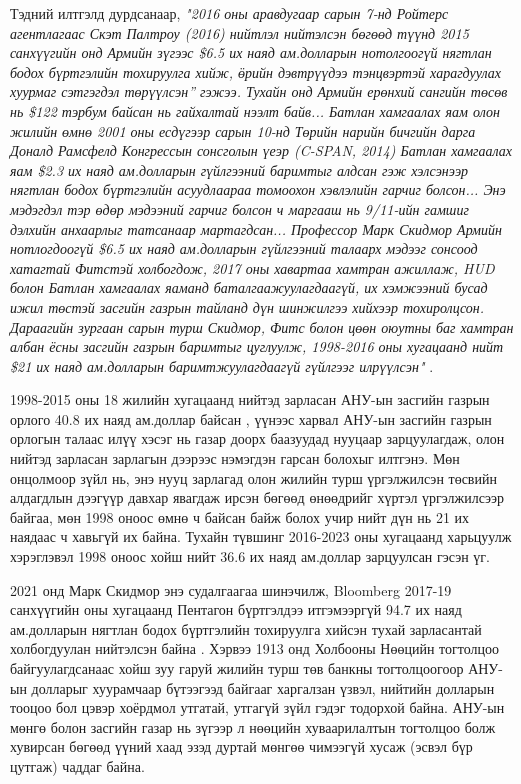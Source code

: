 \documentclass[10pt,twocolumn,letterpaper]{article}
\begin{document}
{Тэдний илтгэлд дурдсанаар, \textit{"2016 оны аравдугаар сарын 7-нд Ройтерс агентлагаас Скэт Палтроу (2016) нийтлэл нийтэлсэн бөгөөд түүнд 2015 санхүүгийн онд Армийн зүгээс \$6.5 их наяд ам.долларын нотолгоогүй нягтлан бодох бүртгэлийн тохируулга хийж, \"өрийн дэвтрүүдээ тэнцвэртэй харагдуулах хуурмаг сэтгэгдэл төрүүлсэн” гэжээ. Тухайн онд Армийн ерөнхий сангийн төсөв нь \$122 тэрбум байсан нь гайхалтай нээлт байв... Батлан хамгаалах яам олон жилийн өмнө 2001 оны есдүгээр сарын 10-нд Төрийн нарийн бичгийн дарга Доналд Рамсфелд Конгрессын сонсголын үеэр (C-SPAN, 2014) Батлан хамгаалах яам \$2.3 их наяд ам.долларын гүйлгээний баримтыг алдсан гэж хэлсэнээр нягтлан бодох бүртгэлийн асуудлаараа томоохон хэвлэлийн гарчиг болсон... Энэ мэдэгдэл тэр өдөр мэдээний гарчиг болсон ч маргааш нь 9/11-ийн гамшиг дэлхийн анхаарлыг татсанаар мартагдсан... Профессор Марк Скидмор Армийн нотлогдоогүй \$6.5 их наяд ам.долларын гүйлгээний талаарх мэдээг сонсоод хатагтай Фитстэй холбогдож, 2017 оны хавартаа хамтран ажиллаж, HUD болон Батлан хамгаалах яаманд баталгаажуулагдаагүй, их хэмжээний бусад ижил төстэй засгийн газрын тайланд дүн шинжилгээ хийхээр тохиролцсон. Дараагийн зургаан сарын турш Скидмор, Фитс болон цөөн оюутны баг хамтран албан ёсны засгийн газрын баримтыг цуглуулж, 1998-2016 оны хугацаанд нийт \$21 их наяд ам.долларын баримтжуулагдаагүй гүйлгээг илрүүлсэн"} \cite{12}.

1998-2015 оны 18 жилийн хугацаанд нийтэд зарласан АНУ-ын засгийн газрын орлого 40.8 их наяд ам.доллар байсан \cite{15}, үүнээс харвал АНУ-ын засгийн газрын орлогын талаас илүү хэсэг нь газар доорх баазуудад нууцаар зарцуулагдаж, олон нийтэд зарласан зарлагын дээрээс нэмэгдэн гарсан болохыг илтгэнэ. Мөн онцолмоор зүйл нь, энэ нууц зарлагад олон жилийн турш үргэлжилсэн төсвийн алдагдлын дээгүүр давхар явагдаж ирсэн бөгөөд өнөөдрийг хүртэл үргэлжилсээр байгаа, мөн 1998 оноос өмнө ч байсан байж болох учир нийт дүн нь 21 их наядаас ч хавьгүй их байна. Тухайн түвшинг 2016-2023 оны хугацаанд харьцуулж хэрэглэвэл 1998 оноос хойш нийт 36.6 их наяд ам.доллар зарцуулсан гэсэн үг.

2021 онд Марк Скидмор энэ судалгаагаа шинэчилж, Bloomberg 2017-19 санхүүгийн оны хугацаанд Пентагон бүртгэлдээ итгэмээргүй 94.7 их наяд ам.долларын нягтлан бодох бүртгэлийн тохируулга хийсэн тухай зарласантай холбогдуулан нийтэлсэн байна \cite{17,18}. Хэрвээ 1913 онд Холбооны Нөөцийн тогтолцоо байгуулагдсанаас хойш зуу гаруй жилийн турш төв банкны тогтолцоогоор АНУ-ын долларыг хуурамчаар бүтээгээд байгааг харгалзан үзвэл, нийтийн долларын тооцоо бол цэвэр хоёрдмол утгатай, утгагүй зүйл гэдэг тодорхой байна. АНУ-ын мөнгө болон засгийн газар нь зүгээр л нөөцийн хуваарилалтын тогтолцоо болж хувирсан бөгөөд үүний хаад эзэд дуртай мөнгөө чимээгүй хусаж (эсвэл бүр цутгаж) чаддаг байна.
}
\end{document}
